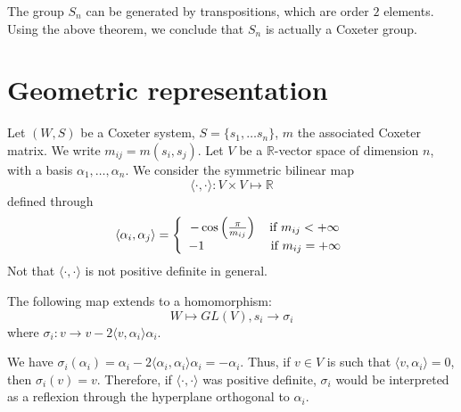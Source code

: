 \begin{example}
The group $S_n$ can be generated by transpositions, which are order $2$ elements. Using the above theorem, we conclude that $S_n$ is actually a Coxeter group.
\end{example}

\section{Geometric representation}

Let $(W, S)$ be a Coxeter system, $S = \{s_1, \ldots s_n \}$, $m$ the associated Coxeter matrix. We write $m_{ij} = m(s_i, s_j)$. Let $V$ be a $\mathbb{R}$-vector space of dimension $n$, with a basis $\alpha_1, \ldots , \alpha_n$. We consider the symmetric bilinear map
\begin{equation}
\langle \cdot, \cdot \rangle : V \times V \mapsto \mathbb{R}
\end{equation} defined through
\begin{equation}
\langle \alpha_i , \alpha_j \rangle = \left \{
\begin{array}{c @{} c}
    &- \cos \left(\frac{\pi}{m_{ij}} \right) \quad \text{if } m_{ij} < + \infty \\
    &-1 \quad ~~~~~~~~~~~~~\text{if } m_{ij} = + \infty \\
\end{array}
\right.
\end{equation} Not that $\langle \cdot, \cdot \rangle$ is not positive definite in general.

\begin{proposition}
The following map extends to a homomorphism:
\begin{equation}
W \mapsto GL(V), s_i \to \sigma_i
\end{equation} where $\sigma_i :v \to  v - 2 \langle v, \alpha_i \rangle \alpha_i$.
\end{proposition}

\begin{remark}
We have $\sigma_i (\alpha_i) = \alpha_i - 2 \langle \alpha_i, \alpha_i \rangle \alpha_i = - \alpha_i$. Thus, if $v\in V$ is such that $\langle v, \alpha_i \rangle = 0$, then $\sigma_i (v) = v$. Therefore, if $\langle \cdot, \cdot \rangle$ was positive definite, $\sigma_i$ would be interpreted as a reflexion through the hyperplane orthogonal to $\alpha_i$.
\end{remark}

